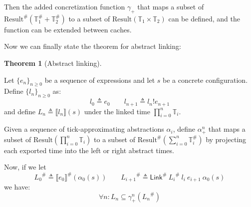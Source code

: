 \documentclass[acmsmall,review]{acmart}\settopmatter{printfolios=true,printccs=false,printacmref=false}
\theoremstyle{definition}
\newtheorem{thm}{Theorem}[section]
\newcommand*{\A}[1]{{#1}^{\#}}
\newcommand*{\Time}{\mathbb{T}}
\newcommand*{\ATime}{\A{\Time}}
\newcommand*{\Result}[1]{\text{Result}({#1})}
\newcommand*{\AResult}[1]{\A{\text{Result}}({#1})}
\newcommand*{\link}[2]{{#1}\mathtt{!}{#2}}
\newcommand*{\Link}{\mathsf{Link}}
\newcommand*{\sembracket}[1]{\lBrack{#1}\rBrack}
\begin{document}
Then the added concretization function $\gamma_{+}$ that maps a subset of $\AResult{\ATime_1+\ATime_2}$ to a subset of $\Result{\Time_1\times\Time_2}$ can be defined,
and the function can be extended between caches.

Now we can finally state the theorem for abstract linking:
\begin{thm}[Abstract linking]
  $\:$

  Let $\{e_n\}_{n\ge 0}$ be a sequence of expressions and let $s$ be a concrete configuration. Define $\{l_n\}_{n\ge 0}$ as:
  \[
    l_0\triangleq e_0\qquad l_{n+1}\triangleq\link{l_n}{e_{n+1}}
  \]
  and define $L_n\triangleq\sembracket{l_n}(s)$ under the linked time $\prod_{i=0}^{n}\Time_i$.

  Given a sequence of tick-approximating abstractions $\alpha_i$, define $\alpha^{n}_+$ that maps a subset of $\Result{\prod_{i=0}^{n}{\Time_i}}$ to a subset of $\AResult{\sum_{i=0}^{n}{\ATime_i}}$ by projecting each exported time into the left or right abstract times.

  Now, if we let
  \[
    \A{L_0}\triangleq\A{\sembracket{e_0}}(\alpha_0(s))\qquad\A{L_{i+1}}\triangleq\A\Link\:\A{L_i}\:l_i\:e_{i+1}\:\alpha_0(s)
  \]
  we have:
  \[
    \forall n:L_n\subseteq \gamma^{n}_+(\A{L_n})
  \]
\end{thm}


\end{document}
